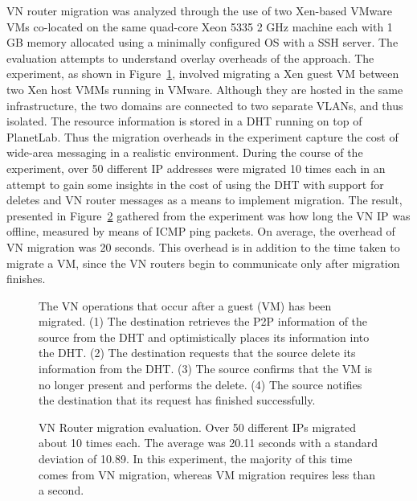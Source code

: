 VN router migration was analyzed through the use of two Xen-based VMware VMs
co-located on the same quad-core Xeon 5335 2 GHz machine each with 1 GB memory
allocated using a minimally configured OS with a SSH server.  The evaluation
attempts to understand overlay overheads of the approach.  The experiment, as
shown in Figure~\ref{fig:migration_ring}, involved migrating a Xen guest VM
between two Xen host VMMs running in VMware.  Although they are hosted in the
same infrastructure, the two domains are connected to two separate VLANs, and
thus isolated.  The resource information is stored in a DHT running on top of
PlanetLab.  Thus the migration overheads in the experiment capture the cost of
wide-area messaging in a realistic environment.  During the course of the
experiment, over 50 different IP addresses were migrated 10 times each in an
attempt to gain some insights in the cost of using the DHT with support for
deletes and VN router messages as a means to implement migration.  The result,
presented in Figure~\ref{fig:mig} gathered from the experiment was how long the
VN IP was offline, measured by means of ICMP ping packets.  On average, the
overhead of VN migration was 20 seconds. This overhead is in addition to the
time taken to migrate a VM, since the VN routers begin to communicate only
after migration finishes. 

\begin{figure}
\centering
{}
\caption[VN Router migration]{The VN operations that occur after a guest (VM)
has been migrated.  (1) The destination retrieves the P2P information of the
source from the DHT and optimistically places its information into the DHT.
(2) The destination requests that the source delete its information from the
DHT.  (3)  The source confirms that the VM is no longer present and performs
the delete.  (4)  The source notifies the destination that its request has
finished successfully.}
\label{fig:migration_ring}
\end{figure}

\begin{figure}
\centering
{}
\caption[VN Router migration evaluation]{VN Router migration evaluation.  Over
50 different IPs migrated about 10 times each.  The average was 20.11 seconds
with a standard deviation of 10.89.  In this experiment, the majority of this
time comes from VN migration, whereas VM migration requires less than a second.}
\label{fig:mig}
\end{figure}

